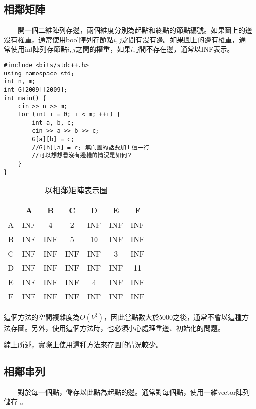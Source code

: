 \subsection{相鄰矩陣}

　　開一個二維陣列存邊，兩個維度分別為起點和終點的節點編號。如果圖上的邊沒有權重，通常使用bool陣列存節點$i,j$之間有沒有邊。如果圖上的邊有權重，通常使用int陣列存節點$i,j$之間的權重，如果$i,j$間不存在邊，通常以INF表示。

\hspace*{\fill}

\begin{lstlisting}[caption=相鄰矩陣]
#include <bits/stdc++.h>
using namespace std;
int n, m;
int G[2009][2009];
int main() {
	cin >> n >> m;
	for (int i = 0; i < m; ++i) {
		int a, b, c;
		cin >> a >> b >> c;
		G[a][b] = c;
		//G[b][a] = c; 無向圖的話要加上這一行
		//可以想想看沒有邊權的情況是如何？
	}
}
\end{lstlisting}

\begin{table}[ht]
\centering
    \begin{tabular}{c|cccccc}
           & A & B & C & D & E & F \\ \hline
         A & INF & 4 & 2 & INF & INF & INF \\ 
         B & INF & INF & 5 & 10 & INF & INF \\
         C & INF & INF & INF & INF & 3 & INF \\
         D & INF & INF & INF & INF & INF & 11 \\
         E & INF & INF & INF & 4 & INF & INF \\
         F & INF & INF & INF & INF & INF & INF \\
    \end{tabular}
\caption{以相鄰矩陣表示圖}
\end{table}

這個方法的空間複雜度為$O(V^2)$，因此當點數大於$5000$之後，通常不會以這種方法存圖。另外，使用這個方法時，也必須小心處理重邊、初始化的問題。

綜上所述，實際上使用這種方法來存圖的情況較少。

\subsection{相鄰串列}

　　對於每一個點，儲存以此點為起點的邊。通常對每個點，使用一維vector陣列儲存 。
\clearpage

